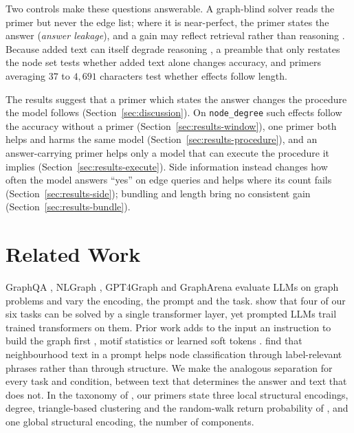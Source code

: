 \documentclass[11pt]{article}
\begin{document}
Two controls make these questions answerable. A graph-blind solver reads the
primer but never the edge list; where it is near-perfect, the primer states
the answer (\emph{answer leakage}), and a gain may reflect retrieval rather
than reasoning \citep{geirhos2020shortcut}. Because added text can itself
degrade reasoning \citep{shi2023distracted,levy2024sametask}, a preamble that
only restates the node set tests whether added text alone changes accuracy,
and primers averaging $37$ to $4{,}691$ characters test whether effects follow
length.

The results suggest that a primer which states the answer changes the
procedure the model follows (Section~\ref{sec:discussion}). On
\texttt{node\_degree} such effects follow the accuracy without a primer
(Section~\ref{sec:results-window}), one primer both helps and harms the same
model (Section~\ref{sec:results-procedure}), and an answer-carrying primer
helps only a model that can execute the procedure it implies
(Section~\ref{sec:results-execute}). Side information instead changes how often
the model answers ``yes'' on edge queries and helps where its count fails
(Section~\ref{sec:results-side}); bundling and length bring no consistent gain
(Section~\ref{sec:results-bundle}).

\section{Related Work}
\label{sec:related}

GraphQA \citep{fatemi2023talklikeagraph}, NLGraph \citep{wang2023nlgraph},
GPT4Graph \citep{guo2023gpt4graph} and GraphArena \citep{tang2025grapharena}
evaluate LLMs on graph problems and vary the encoding, the prompt and the
task. \citet{sanford2024understanding} show that four of our six tasks can be
solved by a single transformer layer, yet prompted LLMs trail trained
transformers on them. Prior work adds to the input an instruction to build the
graph first \citep{wang2023nlgraph}, motif statistics \citep{das2024modality}
or learned soft tokens \citep{perozzi2024letyourgraph}. \citet{huang2024can}
find that neighbourhood text in a prompt helps node classification through
label-relevant phrases rather than through structure. We make the analogous
separation for every task and condition, between text that determines the
answer and text that does not. In the taxonomy of \citet{rampasek2022recipe},
our primers state three local structural encodings, degree, triangle-based
clustering and the random-walk return probability of
\citet{dwivedi2022graph}, and one global structural encoding, the number of
components.
\end{document}
